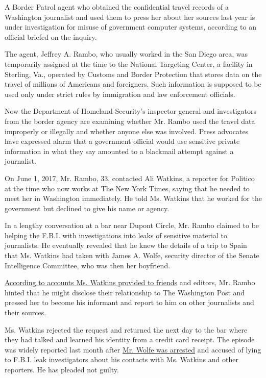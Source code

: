 A Border Patrol agent who obtained the confidential travel records of a
Washington journalist and used them to press her about her sources last
year is under investigation for misuse of government computer systems,
according to an official briefed on the inquiry.

The agent, Jeffrey A. Rambo, who usually worked in the San Diego area,
was temporarily assigned at the time to the National Targeting Center, a
facility in Sterling, Va., operated by Customs and Border Protection
that stores data on the travel of millions of Americans and foreigners.
Such information is supposed to be used only under strict rules by
immigration and law enforcement officials.

Now the Department of Homeland Security's inspector general and
investigators from the border agency are examining whether Mr. Rambo
used the travel data improperly or illegally and whether anyone else was
involved. Press advocates have expressed alarm that a government
official would use sensitive private information in what they say
amounted to a blackmail attempt against a journalist.

On June 1, 2017, Mr. Rambo, 33, contacted Ali Watkins, a reporter for
Politico at the time who now works at The New York Times, saying that he
needed to meet her in Washington immediately. He told Ms. Watkins that
he worked for the government but declined to give his name or agency.

In a lengthy conversation at a bar near Dupont Circle, Mr. Rambo claimed
to be helping the F.B.I. with investigations into leaks of sensitive
material to journalists. He eventually revealed that he knew the details
of a trip to Spain that Ms. Watkins had taken with James A. Wolfe,
security director of the Senate Intelligence Committee, who was then her
boyfriend.

\href{https://www.nytimes3xbfgragh.onion/2018/06/24/business/media/james-wolfe-ali-watkins-leaks-reporter.html}{According
to accounts Ms. Watkins provided to friends} and editors, Mr. Rambo
hinted that he might disclose their relationship to The Washington Post
and pressed her to become his informant and report to him on other
journalists and their sources.

Ms. Watkins rejected the request and returned the next day to the bar
where they had talked and learned his identity from a credit card
receipt. The episode was widely reported last month after
\href{https://www.nytimes3xbfgragh.onion/2018/06/07/us/politics/times-reporter-phone-records-seized.html}{Mr.
Wolfe was arrested} and accused of lying to F.B.I. leak investigators
about his contacts with Ms. Watkins and other reporters. He has pleaded
not guilty.


